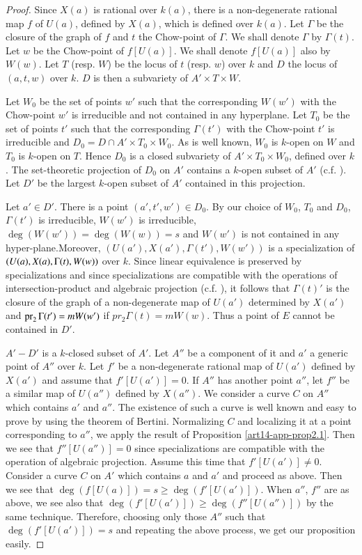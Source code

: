 \begin{proof}
Since $X(a)$ is rational over $k(a)$, there is a non-degenerate rational map $f$ of $U(a)$, defined by $X(a)$, which is defined over $k(a)$. Let $\Gamma$ be the closure of the graph of $f$ and $t$ the Chow-point of $\Gamma$. We shall denote $\Gamma$ by $\Gamma(t)$. Let $w$ be the Chow-point of $f[U(a)]$. We shall denote $f[U(a)]$ also by $W(w)$. Let $T$ (resp. $W$) be the locus of $t$ (resp. $w$) over $k$ and $D$ the locus of $(a,t,w)$ over $k$. $D$ is then a subvariety of $A'\times T\times W$.

Let $W_{0}$ be the set of points $w'$ such that the corresponding $W(w')$ with the Chow-point $w'$ is irreducible and not contained in any hyperplane. Let $T_{0}$ be the set of points $t'$ such that the corresponding $\Gamma(t')$ with the Chow-point $t'$ is irreducible and $D_{0}=D\cap A'\times T_{0}\times W_{0}$. As is well known, $W_{0}$ is $k$-open on $W$ and $T_{0}$ is $k$-open on $T$. Hence $D_{0}$ is a closed subvariety of $A'\times T_{0}\times W_{0}$, defined over $k$. The set-theoretic projection of $D_{0}$ on $A'$ contains a $k$-open subset of $A'$ (c.f. \cite{art14-key28}). Let $D'$ be the largest $k$-open subset of $A'$ contained in this projection.

Let $a'\in D'$. There is a point $(a',t',w')\in D_{0}$. By our choice of $W_{0}$, $T_{0}$ and $D_{0}$, $\Gamma(t')$ is irreducible, $W(w')$ is irreducible, $\deg(W(w'))=\deg(W(w))=s$ and $W(w')$ is not contained in any hyper-plane.\pageoriginale Moreover, $(U(a'), X(a'),\Gamma(t'),W(w'))$ is a specialization of $(U(a), X(a),\Gamma(t),\break W(w))$ over $k$. Since linear equivalence is preserved by specializations and since specializations are compatible with the operations of intersection-product and algebraic projection (c.f. \cite{art14-key24}), it follows that $\Gamma(t)'$ is the closure of the graph of a non-degenerate map of $U(a')$ determined by $X(a')$ and $\operatorname{\mathrm{pr}}_{2}\Gamma(t')=mW(w')$ if $pr_{2}\Gamma(t)=mW(w)$. Thus a point of $E$ cannot be contained in $D'$.

$A'-D'$ is a $k$-closed subset of $A'$. Let $A''$ be a component of it and $a'$ a generic point of $A''$ over $k$. Let $f'$ be a non-degenerate rational map of $U(a')$ defined by $X(a')$ and assume that $f'[U(a')]=0$. If $A''$ has another point $a''$, let $f''$ be a similar map of $U(a'')$ defined by $X(a'')$. We consider a curve $C$ on $A''$ which contains $a'$ and $a''$. The existence of such a curve is well known and easy to prove by using the theorem of Bertini. Normalizing $C$ and localizing it at a point corresponding to $a''$, we apply the result of Proposition \ref{art14-app-prop2.1}. Then we see that $f''[U(a'')]=0$ since specializations are compatible with the operation of algebraic projection. Assume this time that $f'[U(a')]\neq 0$. Consider a curve $C$ on $A'$ which contains $a$ and $a'$ and proceed as above. Then we see that $\deg(f[U(a)])=s\geq \deg(f'[U(a')])$. When $a''$, $f''$ are as above, we see also that $\deg(f'[U(a')])\geq \deg (f''[U(a'')])$ by the same technique. Therefore, choosing only those $A''$ such that $\deg(f'[U(a')])=s$ and repeating the above process, we get our proposition easily.
\end{proof}

